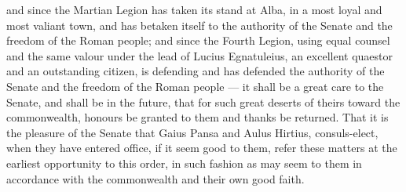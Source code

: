  and since the Martian Legion has taken its stand at Alba, in a most loyal and most valiant town, and has betaken itself to the authority of the Senate and the freedom of the Roman people; and since the Fourth Legion, using equal counsel and the same valour under the lead of Lucius Egnatuleius, an excellent quaestor and an outstanding citizen, is defending and has defended the authority of the Senate and the freedom of the Roman people --- it shall be a great care to the Senate, and shall be in the future, that for such great deserts of theirs toward the commonwealth, honours be granted to them and thanks be returned. That it is the pleasure of the Senate that Gaius Pansa and Aulus Hirtius, consuls-elect, when they have entered office, if it seem good to them, refer these matters at the earliest opportunity to this order, in such fashion as may seem to them in accordance with the commonwealth and their own good faith.


